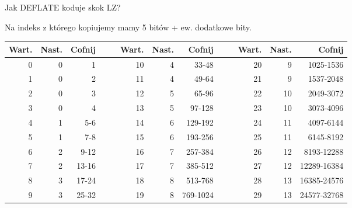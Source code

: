 \documentclass[presentation]{beamer}
\begin{document}
\begin{frame}[label={sec:orgf180097}]{Jak DEFLATE koduje skok LZ?}
\begin{block}{Na indeks z którego kopiujemy mamy 5 bitów + ew. dodatkowe bity.}
{\tiny
\begin{center}
\begin{tabular}{rrrllrrrllrrr}
Wart. & Nast. & Cofnij &  &  & Wart. & Nast. & Cofnij &  &  & Wart. & Nast. & Cofnij\\
\hline
0 & 0 & 1 &  &  & 10 & 4 & 33-48 &  &  & 20 & 9 & 1025-1536\\
1 & 0 & 2 &  &  & 11 & 4 & 49-64 &  &  & 21 & 9 & 1537-2048\\
2 & 0 & 3 &  &  & 12 & 5 & 65-96 &  &  & 22 & 10 & 2049-3072\\
3 & 0 & 4 &  &  & 13 & 5 & 97-128 &  &  & 23 & 10 & 3073-4096\\
4 & 1 & 5-6 &  &  & 14 & 6 & 129-192 &  &  & 24 & 11 & 4097-6144\\
5 & 1 & 7-8 &  &  & 15 & 6 & 193-256 &  &  & 25 & 11 & 6145-8192\\
6 & 2 & 9-12 &  &  & 16 & 7 & 257-384 &  &  & 26 & 12 & 8193-12288\\
7 & 2 & 13-16 &  &  & 17 & 7 & 385-512 &  &  & 27 & 12 & 12289-16384\\
8 & 3 & 17-24 &  &  & 18 & 8 & 513-768 &  &  & 28 & 13 & 16385-24576\\
9 & 3 & 25-32 &  &  & 19 & 8 & 769-1024 &  &  & 29 & 13 & 24577-32768\\
\end{tabular}
\end{center}
}
\end{block}
\end{frame}
\end{document}
